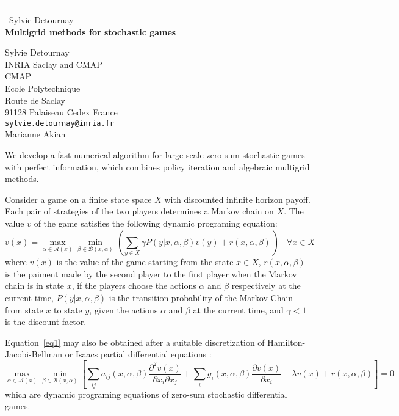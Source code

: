 \documentclass{report}
\begin{document}
\begin{center}
\rule{6in}{1pt} \
{\large Sylvie Detournay \\
{\bf Multigrid methods for stochastic games}}

Sylvie Detournay \\ INRIA Saclay and CMAP \\ CMAP \\ Ecole Polytechnique \\ Route de Saclay \\ 91128 Palaiseau Cedex France
\\
{\tt sylvie.detournay@inria.fr}\\
Marianne Akian\end{center}

We develop a fast numerical algorithm for large scale zero-sum stochastic
games with perfect information, which combines policy iteration and
algebraic multigrid methods.

Consider a game on a finite state space $X$
with discounted infinite horizon payoff.
Each pair of strategies of the two players determines a Markov chain on $X$.
The value $v$ of the game satisfies the following dynamic programing equation:
\def\ACx{\mathcal{A}(x)}
\def\maxa{\max_{\alpha \in \ACx}}
\def\BCx{\mathcal{B}(x,\alpha)}
\def\minb{\min_{\beta \in \BCx}}
\def\minsumy{\minb \left( \sum_{y \in X}
\gamma P(y|x, \alpha, \beta) v(y) + r(x,\alpha, \beta) \right)}
\begin{equation} \label{eq1}
v (x) = \maxa \minsumy \quad \forall x \in X
\end{equation}
where $v(x)$ is the value of the game starting from the state $x \in
X$, $r(x,\alpha,\beta)$ is the paiment made by the second player to the
first player when the Markov chain is
in state $x$, if the players choose the actions
$\alpha$ and $\beta$ respectively at the current
time, $P(y | x, \alpha, \beta)$ is the transition probability of
the Markov Chain from state $x$ to state $y$, given
the actions $\alpha$ and $\beta$ at the current time,
and $\gamma<1$ is the discount factor.

Equation~\eqref{eq1} may also be obtained after a suitable discretization
of Hamilton-Jacobi-Bellman or Isaacs partial differential equations :
\begin{equation} \label{eq2}
\maxa \minb \left[ \sum_{ij} a_{ij}(x, \alpha, \beta)
\frac{ \partial^2 v(x)}{\partial x_i \partial x_j}
+ \sum_{i} g_i(x, \alpha, \beta) \frac{ \partial v(x)}{\partial x_i} - \lambda v(x) +
r(x,\alpha, \beta) \right] = 0
\end{equation}
which are dynamic programing equations of zero-sum stochastic differential games.
\end{document}
